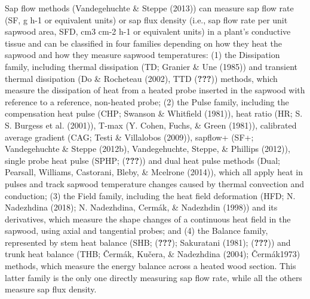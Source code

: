 \documentclass[11pt,twoside]{reedthesis}
\begin{document}
Sap flow methods (Vandegehuchte \& Steppe (2013)) can measure sap flow
rate (SF, g h-1 or equivalent units) or sap flux density (i.e., sap flow
rate per unit sapwood area, SFD, cm3 cm-2 h-1 or equivalent units) in a
plant's conductive tissue and can be classified in four families
depending on how they heat the sapwood and how they measure sapwood
temperatures: (1) the Dissipation family, including thermal dissipation
(TD; Granier \& Une (1985)) and transient thermal dissipation (Do \&
Rocheteau (2002), TTD ({\textbf{???}})) methods, which measure the
dissipation of heat from a heated probe inserted in the sapwood with
reference to a reference, non-heated probe; (2) the Pulse family,
including the compensation heat pulse (CHP; Swanson \& Whitfield
(1981)), heat ratio (HR; S. S. Burgess et al. (2001)), T-max (Y. Cohen,
Fuchs, \& Green (1981)), calibrated average gradient (CAG; Testi \&
Villalobos (2009)), sapflow+ (SF+; Vandegehuchte \& Steppe (2012b),
Vandegehuchte, Steppe, \& Phillips (2012)), single probe heat pulse
(SPHP; ({\textbf{???}})) and dual heat pulse methods (Dual; Pearsall,
Williams, Castorani, Bleby, \& Mcelrone (2014)), which all apply heat in
pulses and track sapwood temperature changes caused by thermal
convection and conduction; (3) the Field family, including the heat
field deformation (HFD; N. Nadezhdina (2018); N. Nadezhdina, Cermák, \&
Nadezhdin (1998)) and its derivatives, which measure the shape changes
of a continuous heat field in the sapwood, using axial and tangential
probes; and (4) the Balance family, represented by stem heat balance
(SHB; ({\textbf{???}}); Sakuratani (1981); ({\textbf{???}})) and trunk
heat balance (THB; Čermák, Kučera, \& Nadezhdina (2004); Čermák1973)
methods, which measure the energy balance across a heated wood section.
This latter family is the only one directly measuring sap flow rate,
while all the others measure sap flux density.\par
\end{document}
